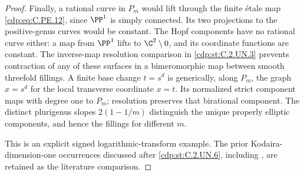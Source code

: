 \begin{proof}
Finally, a rational curve in $P_m$ would lift
through the finite \'etale map \eqref{cdp:eq:C.PE.12}, since
$\PP^1$ is simply connected. Its two projections
to the positive-genus curves would be constant.
The Hopf components have no rational curve
either: a map from $\PP^1$ lifts to
$\C^2\setminus0$, and its coordinate functions
are constant. The inverse-map resolution
comparison in \ref{cdp:st:C.2.UN.3} prevents contraction
of any of these surfaces in a bimeromorphic
map between smooth threefold fillings. A
finite base change $t=s^d$ is generically,
along $P_m$, the graph $x=s^d$ for the local
transverse coordinate $x=t$. Its normalized
strict component maps with degree one to
$P_m$; resolution preserves that birational
component. The distinct plurigenus slopes
$2(1-1/m)$ distinguish the unique properly
elliptic components, and hence the fillings
for different $m$.

This is an explicit signed logarithmic-transform
example. The prior Kodaira-dimension-one
occurrences discussed after \ref{cdp:st:C.2.UN.6}, including
\cite[Example~3.4(1)]{Fujimoto1988Log}, are retained
as the literature comparison.
\end{proof}


